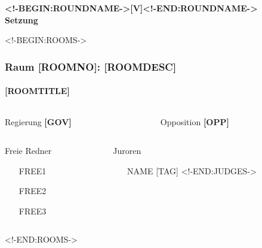 \documentclass[german,12pt,t]{beamer}
\begin{document}
\begin{frame}
  \vfill
  \begin{center}
    \huge\bfseries{} <!-BEGIN:ROUNDNAME->[V]<!-END:ROUNDNAME->\\
    Setzung
  \end{center}  
  \vfill
\end{frame}



<!-BEGIN:ROOMS->
\begin{frame}[squeeze]
  \frametitle{Raum [ROOMNO]: [ROOMDESC]}
  \framesubtitle{[ROOMTITLE]}
  \vspace{-1.5em}
  \begin{columns}
    \begin{column}{0.5\linewidth}
      \begin{block}{\small Regierung}
        \centering\hspace{0pt}
        \textbf{[GOV]}
      \end{block}
    \end{column}
    \begin{column}{0.5\linewidth}
      \begin{block}{\small Opposition}
        \centering\hspace{0pt}
        \textbf{[OPP]}
      \end{block}
    \end{column}
  \end{columns}
  \vspace{0.5em}
  \begin{columns}
     \begin{column}{0.5\linewidth}
       \begin{block}{\small Freie Redner}
         \begin{enumerate}
         \item [FREE1]
         \item [FREE2]
         \item [FREE3]
         \end{enumerate}
       \end{block}
     \end{column}
     \begin{column}{0.5\linewidth}
       \begin{block}{\small Juroren}
         \begin{itemize}
           <!-BEGIN:JUDGES->
         \item [NAME] {\small [TAG]} 
           <!-END:JUDGES->
         \end{itemize}
       \end{block}
     \end{column}
   \end{columns}
\end{frame}
<!-END:ROOMS->
\end{document}
